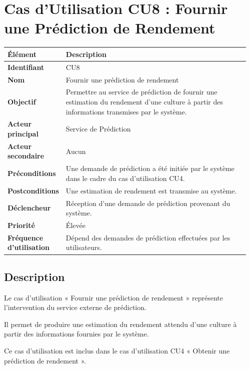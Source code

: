 \hypertarget{cas-dutilisation-cu8-fournir-une-pruxe9diction-de-rendement}{%
\section{Cas d'Utilisation CU8 : Fournir une Prédiction de
Rendement}\label{cas-dutilisation-cu8-fournir-une-pruxe9diction-de-rendement}}

\begin{longtable}{@{}p{0.18\linewidth}p{0.78\linewidth}@{}}
\toprule
\rowcolors{2}{gray!10}{white}
\textbf{Élément} & \textbf{Description} \\
\midrule
\endhead
\textbf{Identifiant} & CU8 \\
\textbf{Nom} & Fournir une prédiction de rendement \\
\textbf{Objectif} & Permettre au service de prédiction de fournir une
estimation du rendement d'une culture à partir des informations
transmises par le système. \\
\textbf{Acteur principal} & Service de Prédiction \\
\textbf{Acteur secondaire} & Aucun \\
\textbf{Préconditions} & Une demande de prédiction a été initiée par le
système dans le cadre du cas d'utilisation CU4. \\
\textbf{Postconditions} & Une estimation de rendement est transmise au
système. \\
\textbf{Déclencheur} & Réception d'une demande de prédiction provenant
du système. \\
\textbf{Priorité} & Élevée \\
\textbf{Fréquence d'utilisation} & Dépend des demandes de prédiction
effectuées par les utilisateurs. \\
\bottomrule
\end{longtable}

\hypertarget{description-6}{%
\subsection{Description}\label{description-6}}

Le cas d'utilisation « Fournir une prédiction de rendement » représente
l'intervention du service externe de prédiction.

Il permet de produire une estimation du rendement attendu d'une culture
à partir des informations fournies par le système.

Ce cas d'utilisation est inclus dans le cas d'utilisation CU4 « Obtenir
une prédiction de rendement ».

